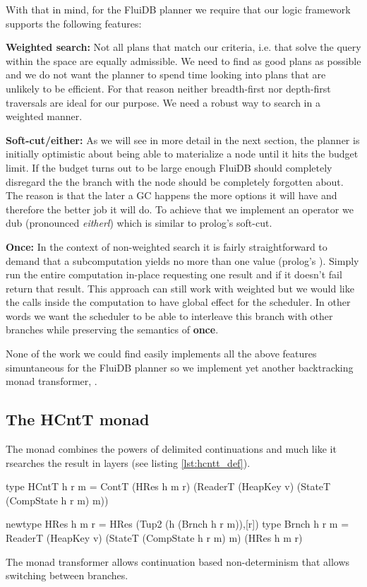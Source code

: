 With that in mind, for the FluiDB planner we require that our logic
framework supports the following features:

\textbf{Weighted search:} Not all plans that match our criteria, i.e. that
solve the query within the space are equally admissible. We need to
find as good plans as possible and we do not want the planner to spend
time looking into plans that are unlikely to be efficient. For that
reason neither breadth-first nor depth-first traversals are ideal for
our purpose. We need a robust way to search in a weighted manner.

\textbf{Soft-cut/either:} As we will see in more detail in the next section,
the planner is initially optimistic about being able to materialize a
node until it hits the budget limit. If the budget turns out to be
large enough FluiDB should completely disregard the the branch with
the node should be completely forgotten about. The reason is that the
later a GC happens the more options it will have and therefore the
better job it will do. To achieve that we implement an operator we dub
\hask{<//>} (pronounced \emph{eitherl}) which is similar to prolog's soft-cut.

\textbf{Once:} In the context of non-weighted search it is fairly
straightforward to demand that a subcomputation yields no more than
one value (prolog's ). Simply run the entire computation
in-place requesting one result and if it doesn't fail return that
result. This approach can still work with weighted but we would like
the  calls inside the computation to have global effect for the
scheduler. In other words we want the scheduler to be able to
interleave this branch with other branches while preserving the
semantics of \textbf{once}.

None of the work we could find easily implements all the above
features simuntaneous for the FluiDB planner so we implement yet
another backtracking monad transformer, .


\subsection{The HCntT monad}

The  monad combines the powers of delimited continuations and
much like \cite{kidneyAlgebrasWeightedSearch2021} it rsearches the
result in layers (see listing \ref{lst:hcntt_def}).

\begin{code}
\begin{haskellcode}
type HCntT h r m = ContT (HRes h m r)
  (ReaderT (HeapKey v)
   (StateT (CompState h r m) m))

newtype HRes h m r = HRes (Tup2 (h (Brnch h r m)),[r])
type Brnch h r m = ReaderT (HeapKey v)
  (StateT (CompState h r m) m) (HRes h m r)
\end{haskellcode}
\label{lst:hcntt_def}
\caption{The  monad transformer allows continuation based
  non-determinism that allows switching between branches.}
\end{code}

